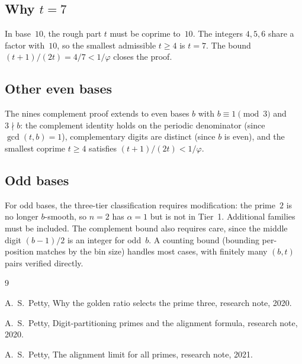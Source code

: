 \documentclass[12pt]{amsart}
\theoremstyle{definition}
\theoremstyle{remark}
\begin{document}
\subsection*{Why $t = 7$}

In base~$10$, the rough part $t$ must be coprime to~$10$.
The integers $4, 5, 6$ share a factor with~$10$, so
the smallest admissible $t \ge 4$ is $t = 7$. The bound
$(t{+}1)/(2t) = 4/7 < 1/\varphi$ closes the proof.

\subsection*{Other even bases}

The nines complement proof extends to even bases $b$
with $b \equiv 1 \pmod{3}$ and $3 \nmid b$: the
complement identity holds on the periodic denominator
(since $\gcd(t, b) = 1$), complementary digits are
distinct (since $b$ is even), and the smallest coprime
$t \ge 4$ satisfies $(t{+}1)/(2t) < 1/\varphi$.

\subsection*{Odd bases}

For odd bases, the three-tier classification requires
modification: the prime~$2$ is no longer $b$-smooth,
so $n = 2$ has $\alpha = 1$ but is not in Tier~1.
Additional families must be included. The complement
bound also requires care, since the middle digit
$(b{-}1)/2$ is an integer for odd~$b$. A counting
bound (bounding per-position matches by the bin size)
handles most cases, with finitely many $(b, t)$ pairs
verified directly.

\begin{thebibliography}{9}

A.~S.~Petty,
Why the golden ratio selects the prime three,
research note, 2020.

A.~S.~Petty,
Digit-partitioning primes and the alignment formula,
research note, 2020.

A.~S.~Petty,
The alignment limit for all primes,
research note, 2021.

\end{thebibliography}
\end{document}
